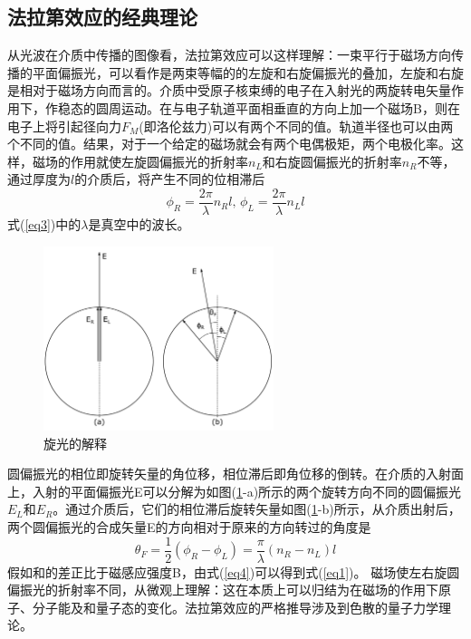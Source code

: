 \documentclass[a4paper]{article}
\begin{document}
\subsection{法拉第效应的经典理论}
从光波在介质中传播的图像看，法拉第效应可以这样理解：一束平行于磁场方向传播的平面偏振光，可以看作是两束等幅的的左旋和右旋偏振光的叠加，左旋和右旋是相对于磁场方向而言的。介质中受原子核束缚的电子在入射光的两旋转电矢量作用下，作稳态的圆周运动。在与电子轨道平面相垂直的方向上加一个磁场B，则在电子上将引起径向力$F_M$(即洛伦兹力)可以有两个不同的值。轨道半径也可以由两个不同的值。结果，对于一个给定的磁场就会有两个电偶极矩，两个电极化率。这样，磁场的作用就使左旋圆偏振光的折射率$n_L$和右旋圆偏振光的折射率$n_R$不等，通过厚度为$l$的介质后，将产生不同的位相滞后
\begin{equation}
\phi_R = \frac{2\pi}{\lambda}n_Rl\text{, }\phi_L = \frac{2\pi}{\lambda}n_Ll\label{eq3}
\end{equation}
式(\ref{eq3})中的$\lambda$是真空中的波长。
\begin{figure}[!h]
\centering
\includegraphics[width=0.6\textwidth]{fig/fig3.pdf}
\caption{旋光的解释}\label{fig3}
\end{figure}

圆偏振光的相位即旋转矢量的角位移，相位滞后即角位移的倒转。在介质的入射面上，入射的平面偏振光E可以分解为如图(\ref{fig3}-a)所示的两个旋转方向不同的圆偏振光$E_L$和$E_R$。通过介质后，它们的相位滞后旋转矢量如图(\ref{fig3}-b)所示，从介质出射后，两个圆偏振光的合成矢量E的方向相对于原来的方向转过的角度是
\begin{equation}
\theta_F = \frac{1}{2}(\phi_R - \phi_L) = \frac{\pi}{\lambda}(n_R - n_L)l\label{eq4}
\end{equation}
假如和的差正比于磁感应强度B，由式(\ref{eq4})可以得到式(\ref{eq1})。
磁场使左右旋圆偏振光的折射率不同，从微观上理解：这在本质上可以归结为在磁场的作用下原子、分子能及和量子态的变化。法拉第效应的严格推导涉及到色散的量子力学理论。
\end{document}
